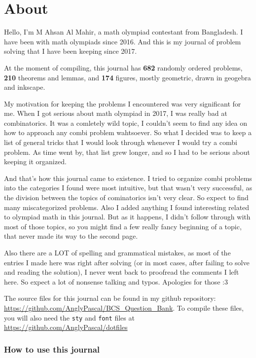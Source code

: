 \chapter*{About}
\thispagestyle{empty}

Hello, I'm M Ahsan Al Mahir, a math olympiad contestant from Bangladesh. I have been with
math olympiads since 2016. And this is my journal of problem solving that I have been
keeping since 2017. 

At the moment of compiling, this journal has \textbf{682} randomly ordered problems,
\textbf{210} theorems and lemmas, and \textbf{174} figures, mostly geometric, drawn in
geogebra and inkscape.

My motivation for keeping the problems I encountered was very significant for me. When I
got serious about math olympiad in 2017, I was really bad at combinatorics. It was a
comletely wild topic, I couldn't seem to find any idea on how to approach any combi
problem wahtsoever. So what I decided was to keep a list of general tricks that I would
look through whenever I would try a combi problem. As time went by, that list grew longer,
and so I had to be serious about keeping it organized.

And that's how this journal came to existence. I tried to organize combi problems into the
categories I found were most intuitive, but that wasn't very successful, as the division
between the topics of cominatorics isn't very clear. So expect to find many miscategorized
problems. Also I added anything I found interesting related to olympiad math in this
journal. But as it happens, I didn't follow through with most of those topics, so you
might find a few really fancy beginning of a topic, that never made its way to the second
page.

Also there are a LOT of spelling and grammatical mistakes, as most of the entries I made
here was right after solving (or in most cases, after failing to solve and reading the
solution), I never went back to proofread the comments I left here. So expect a lot of
nonsense talking and typos. Apologies for those :3 

The source files for this journal can be found in my github repository:
\url{https://github.com/AnglyPascal/BCS_Question_Bank}. To compile these files, you will
also need the \texttt{sty} and \texttt{font} files at
\url{https://github.com/AnglyPascal/dotfiles}


\subsection*{How to use this journal}

